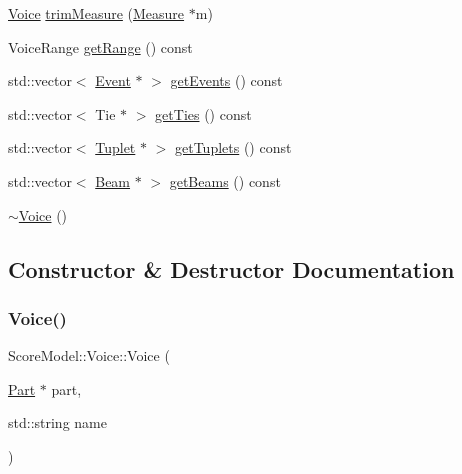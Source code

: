 \begin{DoxyCompactItemize}
\item 
\mbox{\hyperlink{classScoreModel_1_1Voice}{Voice}} \mbox{\hyperlink{classScoreModel_1_1Voice_ad0027fbbd10c314a08385f3030fae13d}{trim\+Measure}} (\mbox{\hyperlink{classScoreModel_1_1Measure}{Measure}} $\ast$m)
\item 
Voice\+Range \mbox{\hyperlink{classScoreModel_1_1Voice_a2249c4f4152e849683b32727cd2c3371}{get\+Range}} () const
\item 
std\+::vector$<$ \mbox{\hyperlink{classScoreModel_1_1Event}{Event}} $\ast$ $>$ \mbox{\hyperlink{classScoreModel_1_1Voice_acbbfa1e87da6dfd568150f5a18067dd1}{get\+Events}} () const
\item 
std\+::vector$<$ Tie $\ast$ $>$ \mbox{\hyperlink{classScoreModel_1_1Voice_aeff975af9f78750447629c56011876f4}{get\+Ties}} () const
\item 
std\+::vector$<$ \mbox{\hyperlink{classScoreModel_1_1Tuplet}{Tuplet}} $\ast$ $>$ \mbox{\hyperlink{classScoreModel_1_1Voice_a535d10ca5d99b50873913e95c4dff50b}{get\+Tuplets}} () const
\item 
std\+::vector$<$ \mbox{\hyperlink{classScoreModel_1_1Beam}{Beam}} $\ast$ $>$ \mbox{\hyperlink{classScoreModel_1_1Voice_a1d0d1312e5571c1352b19ecb8af6ab35}{get\+Beams}} () const
\item 
\mbox{\hyperlink{classScoreModel_1_1Voice_a60df4b72aa67feecbf46ff57e4c28f14}{$\sim$\+Voice}} ()
\end{DoxyCompactItemize}


\subsection{Constructor \& Destructor Documentation}
\mbox{\label{classScoreModel_1_1Voice_a643750fa08c8cbb778e954006f8327ee}} 
\subsubsection{\texorpdfstring{Voice()}{Voice()}}
{\footnotesize\ttfamily Score\+Model\+::\+Voice\+::\+Voice (\begin{DoxyParamCaption}\item[{\mbox{\hyperlink{classScoreModel_1_1Part}{Part}} $\ast$}]{part,  }\item[{std\+::string}]{name }\end{DoxyParamCaption})}

